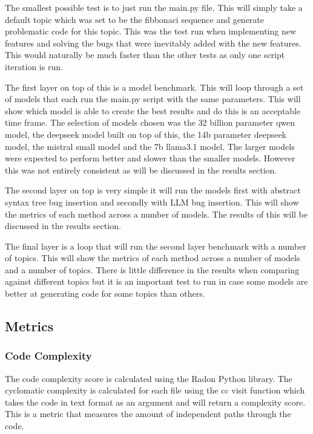 \documentclass[12pt]{extarticle}
\begin{document}
The smallest possible test is to just run the main.py file. This will simply take a default topic which was set to be the fibbonaci sequence and generate problematic code for this topic. This was the test run when implementing new features and solving the bugs that were inevitably added with the new features. This would naturally be much faster than the other tests as only one script iteration is run.

The first layer on top of this is a model benchmark. This will loop through a set of models that each run the main.py script with the same parameters. This will show which model is able to create the best results and do this is an acceptable time frame. The selection of models chosen was the 32 billion parameter qwen model, the deepseek model built on top of this, the 14b parameter deepseek model, the mistral small model and the 7b llama3.1 model. The larger models were expected to perform better and slower than the smaller models. However this was not entirely consistent as will be discussed in the results section.

The second layer on top is very simple it will run the models first with abstract syntax tree bug insertion and secondly with LLM bug insertion. This will show the metrics of each method across a number of models. The results of this will be discussed in the results section.

The final layer is a loop that will run the second layer benchmark with a number of topics. This will show the metrics of each method across a number of models and a number of topics. There is little difference in the results when comparing against different topics but it is an important test to run in case some models are better at generating code for some topics than others.

\subsection{Metrics}
\subsubsection{Code Complexity}

The code complexity score is calculated using the Radon Python library. The cyclomatic complexity \cite{esposito2024} is calculated for each file using the cc visit function which takes the code in text format as an argument and will return a complexity score. This is a metric that measures the amount of independent paths through the code.
\end{document}
